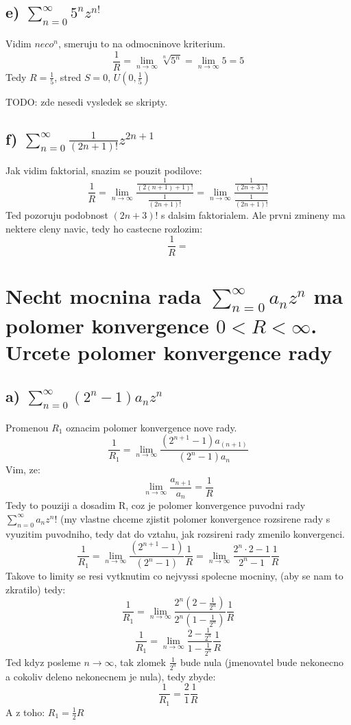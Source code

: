 \subsection{e) $\sum_{n=0}^\infty 5^n z^{n!}$}
Vidim $neco^n$, smeruju to na odmocninove kriterium.
$$\frac{1}{R} = \lim_{n \to \infty} \sqrt[n]{5^n} = \lim_{n \to \infty} 5 =5$$
Tedy $R=\frac{1}{5}$, stred $S=0$, $U(0,\frac{1}{5})$

TODO: zde nesedi vysledek se skripty.

\subsection{f) $\sum_{n=0}^\infty \frac{1}{(2n+1)!}z^{2n+1}$}
Jak vidim faktorial, snazim se pouzit podilove:
$$\frac{1}{R} = \lim_{n \to \infty} \frac{\frac{1}{(2(n+1)+1)!}}{\frac{1}{(2n+1)!}} = \lim_{n \to \infty} \frac{\frac{1}{(2n+3)!}}{\frac{1}{(2n+1)!}}$$
Ted pozoruju podobnost $(2n+3)!$ s dalsim faktorialem. Ale prvni zmineny ma nektere cleny navic, tedy ho castecne rozlozim:
$$\frac{1}{R} = $$


\section{Necht mocnina rada $\sum_{n=0}^\infty a_n z^n$ ma polomer konvergence $0< R <\infty$. Urcete polomer konvergence rady}
\subsection*{a) $\sum_{n=0}^\infty (2^n-1)a_n z^n$}
Promenou $R_1$ oznacim polomer konvergence nove rady.
$$\frac{1}{R_1} = \lim_{n \to \infty} \frac{(2^{n+1}-1) a_{(n+1)}}{(2^n-1)a_n}$$
Vim, ze:
$$\lim_{n \to \infty} \frac{a_{n+1}}{a_n} = \frac{1}{R}$$
Tedy to pouziji a dosadim R, coz je polomer konvergence puvodni rady $\sum_{n=0}^\infty a_n z^n$!
(my vlastne chceme zjistit polomer konvergence rozsirene rady s vyuzitim puvodniho, tedy dat do vztahu, jak rozsireni rady zmenilo konvergenci.
$$\frac{1}{R_1} = \lim_{n \to \infty} \frac{(2^{n+1}-1)}{(2^n-1)}\frac{1}{R} =  \lim_{n \to \infty} \frac{2^n\cdot 2 - 1}{2^n -1} \frac{1}{R}$$
Takove to limity se resi vytknutim co nejvyssi spolecne mocniny, (aby se nam to zkratilo) tedy:
$$\frac{1}{R_1} = \lim_{n \to \infty} \frac{2^n (2-\frac{1}{2^n})}{2^n (1 - \frac{1}{2^n})} \frac{1}{R}$$
$$\frac{1}{R_1} = \lim_{n \to \infty} \frac{2-\frac{1}{2^n}}{1-\frac{1}{2^n}}\frac{1}{R}$$
Ted kdyz posleme $n \to \infty$, tak zlomek $\frac{1}{2^n}$ bude nula (jmenovatel bude nekonecno a cokoliv deleno nekonecnem je nula), tedy zbyde:
$$\frac{1}{R_1} = \frac{2}{1} \frac{1}{R}$$
A z toho:
$R_1 = \frac{1}{2} R$

